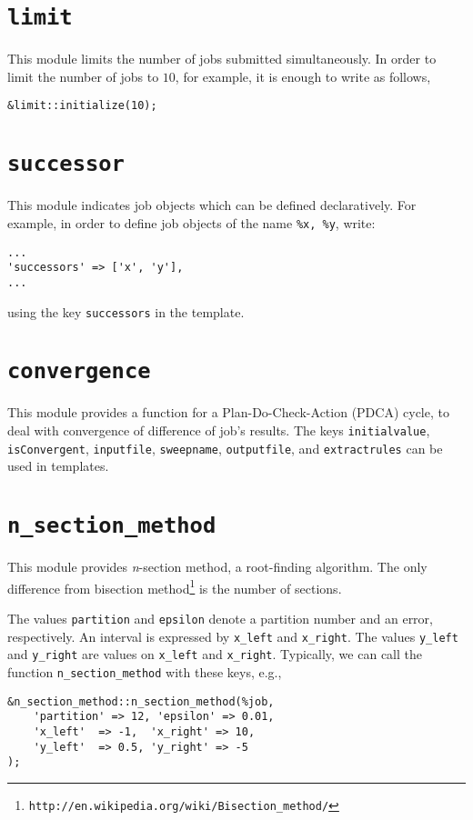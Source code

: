 \documentclass[a4paper,10pt]{report}
\begin{document}
\section{\texttt{limit}}

This module limits the number of jobs submitted simultaneously.
In order to limit the number of jobs to $10$, for example, it is enough to
write as follows,
\begin{boxnote}
\begin{verbatim}
&limit::initialize(10);
\end{verbatim}
\end{boxnote}

\section{\texttt{successor}}

This module indicates job objects which can be defined declaratively.
For example, in order to define job objects of the name \texttt{\%x,
\%y}, write:
\begin{boxnote}
\begin{verbatim}
...
'successors' => ['x', 'y'],
...
\end{verbatim}
\end{boxnote}
\vspace{\baselineskip}
\noindent
using the key \texttt{successors} in the template.

\section{\texttt{convergence}}

This module provides a function for a Plan-Do-Check-Action (PDCA)
cycle, to deal with convergence of difference of job's results.  The
keys \texttt{initialvalue}, \texttt{isConvergent}, \texttt{inputfile},
\texttt{sweepname}, \texttt{outputfile}, and \texttt{extractrules} can
be used in templates.

\section{\texttt{n\_section\_method}}

This module provides \textit{n}-section method, a root-finding
algorithm. The only difference from bisection
method\footnote{\texttt{http://en.wikipedia.org/wiki/Bisection\_method/}}
is the number of sections.

The values \texttt{partition} and \texttt{epsilon} denote
    a partition number and an error, respectively.  An interval is
    expressed by \texttt{x\_left} and \texttt{x\_right}.  The values
    \texttt{y\_left} and \texttt{y\_right} are values on \texttt{x\_left}
    and \texttt{x\_right}.  Typically, we can call the function
    \texttt{n\_section\_method} with these keys, e.g.,
\begin{boxnote}
\begin{verbatim}
&n_section_method::n_section_method(%job,
    'partition' => 12, 'epsilon' => 0.01,
    'x_left'  => -1,  'x_right' => 10,
    'y_left'  => 0.5, 'y_right' => -5
);
\end{verbatim}
\end{boxnote}
\end{document}

